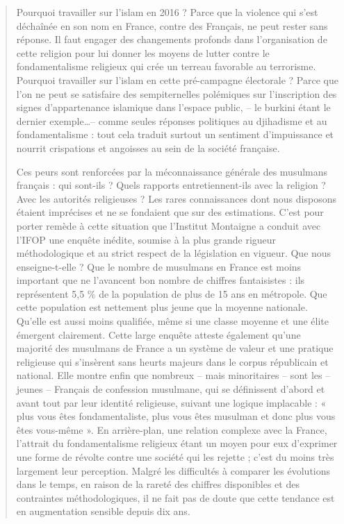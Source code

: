 \begin{quote}
Pourquoi travailler sur l'islam en 2016 ? Parce que la violence qui
s'est déchaînée en son nom en France, contre des Français, ne peut
rester sans réponse. Il faut engager des changements profonds dans
l'organisation de cette religion pour lui donner les moyens de lutter
contre le fondamentalisme religieux qui crée un terreau favorable au
terrorisme. Pourquoi travailler sur l'islam en cette pré-campagne
électorale ? Parce que l'on ne peut se satisfaire des sempiternelles
polémiques sur l'inscription des signes d'appartenance islamique dans
l'espace public, -- le burkini étant le dernier exemple\ldots-- comme
seules réponses politiques au djihadisme et au fondamentalisme : tout
cela traduit surtout un sentiment d'impuissance et nourrit crispations
et angoisses au sein de la société française.

Ces peurs sont renforcées par la méconnaissance générale des musulmans
français : qui sont-ils ? Quels rapports entretiennent-ils avec la
religion ? Avec les autorités religieuses ? Les rares connaissances dont
nous disposons étaient imprécises et ne se fondaient que sur des
estimations. C'est pour porter remède à cette situation que l'Institut
Montaigne a conduit avec l'IFOP une enquête inédite, soumise à la plus
grande rigueur méthodologique et au strict respect de la législation en
vigueur. Que nous enseigne-t-elle ? Que le nombre de musulmans en France
est moins important que ne l'avancent bon nombre de chiffres
fantaisistes : ils représentent 5,5 \% de la population de plus de 15
ans en métropole. Que cette population est nettement plus jeune que la
moyenne nationale. Qu'elle est aussi moins qualifiée, même si une classe
moyenne et une élite émergent clairement. Cette large enquête atteste
également qu'une majorité des musulmans de France a un système de valeur
et une pratique religieuse qui s'insèrent sans heurts majeurs dans le
corpus républicain et national. Elle montre enfin que nombreux -- mais
minoritaires -- sont les -- jeunes -- Français de confession musulmane,
qui se définissent d'abord et avant tout par leur identité religieuse,
suivant une logique implacable : « plus vous êtes fondamentaliste, plus
vous êtes musulman et donc plus vous êtes vous-même ». En arrière-plan,
une relation complexe avec la France, l'attrait du fondamentalisme
religieux étant un moyen pour eux d'exprimer une forme de révolte contre
une société qui les rejette ; c'est du moins très largement leur
perception. Malgré les difficultés à comparer les évolutions dans le
temps, en raison de la rareté des chiffres disponibles et des
contraintes méthodologiques, il ne fait pas de doute que cette tendance
est en augmentation sensible depuis dix ans.


\end{quote}
